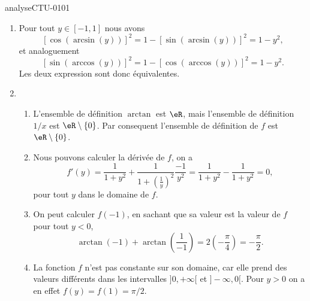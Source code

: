
\begin{corrige}{analyseCTU-0101}

   \begin{enumerate}
      \item Pour tout $y \in [-1,1]$ nous avons 
        \begin{equation*}
          \left[\cos (\arcsin(y)) \right]^2 = 1 -  \left[\sin (\arcsin(y)) \right]^2 = 1- y^2,
        \end{equation*}
et analoguement 
 \begin{equation*}
          \left[ \sin(\arccos(y))\right]^2 = 1 -  \left[\cos(\arccos(y))\right]^2 = 1- y^2.
        \end{equation*}
 Les deux expression sont donc \'equivalentes. 
        \item
            \begin{enumerate}
            \item L'ensemble de définition $\arctan$ est $\eR$, mais l'ensemble de  définition $1/x$ est $\eR\setminus\{0\}$. Par consequent l'ensemble de définition de $f$ est $\eR\setminus\{0\}$.
              \item Nous pouvons calculer la dérivée de $f$, on a  
                \begin{equation*}
                  f'(y) = \frac{1}{1+y^2} + \frac{1}{1+\left(\frac{1}{y}\right)^2}\frac{-1}{y^2} = \frac{1}{1+y^2} - \frac{1}{1+y^2} = 0,
                \end{equation*}
pour tout $y$ dans le domaine de $f$.
              \item On peut calculer $f(-1)$, en sachant que sa valeur est la valeur de $f$ pour tout \( y<0\),
            \begin{equation}
                \arctan(-1)+\arctan(\frac{1}{ -1 })= 2 \left(-\frac{ \pi }{ 4 }\right) = -\frac{ \pi }{ 2 }.
            \end{equation}
          \item La fonction $f$ n'est pas constante sur son domaine, car elle prend des valeurs diff\'erents dans les intervalles $]0,+\infty[$ et $]-\infty, 0[$. Pour $y>0$ on a en effet $f(y) = f(1) = \pi/2$.  
            \end{enumerate}
    \end{enumerate}

\end{corrige}
